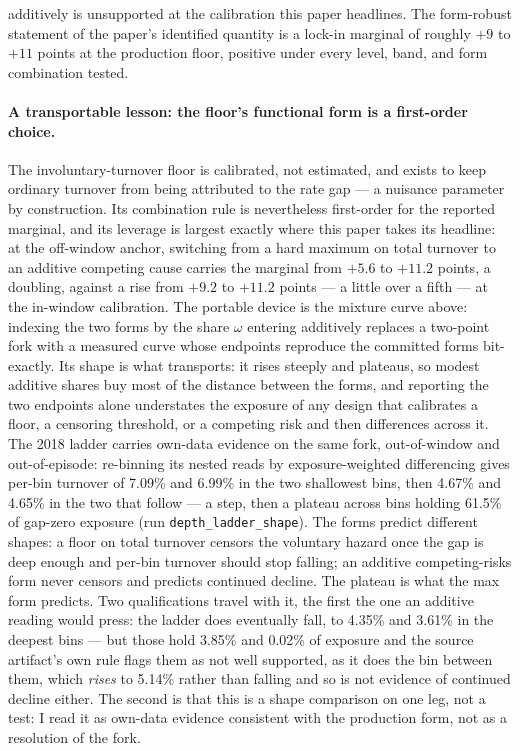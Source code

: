 \documentclass[12pt]{article}
\begin{document}
additively is unsupported at the calibration this paper headlines. The form-robust statement of the paper's identified quantity is a lock-in marginal of roughly $+9$ to $+11$ points at the production floor, positive under every level, band, and form combination tested.

\paragraph{A transportable lesson: the floor's functional form is a first-order choice.} The involuntary-turnover floor is calibrated, not estimated, and exists to keep ordinary turnover from being attributed to the rate gap --- a nuisance parameter by construction. Its combination rule is nevertheless first-order for the reported marginal, and its leverage is largest exactly where this paper takes its headline: at the off-window anchor, switching from a hard maximum on total turnover to an additive competing cause carries the marginal from $+5.6$ to $+11.2$ points, a doubling, against a rise from $+9.2$ to $+11.2$ points --- a little over a fifth --- at the in-window calibration. The portable device is the mixture curve above: indexing the two forms by the share $\omega$ entering additively replaces a two-point fork with a measured curve whose endpoints reproduce the committed forms bit-exactly. Its shape is what transports: it rises steeply and plateaus, so modest additive shares buy most of the distance between the forms, and reporting the two endpoints alone understates the exposure of any design that calibrates a floor, a censoring threshold, or a competing risk and then differences across it. The 2018 ladder carries own-data evidence on the same fork, out-of-window and out-of-episode: re-binning its nested reads by exposure-weighted differencing gives per-bin turnover of 7.09\% and 6.99\% in the two shallowest bins, then 4.67\% and 4.65\% in the two that follow --- a step, then a plateau across bins holding 61.5\% of gap-zero exposure (run \texttt{depth\_ladder\_shape}). The forms predict different shapes: a floor on total turnover censors the voluntary hazard once the gap is deep enough and per-bin turnover should stop falling; an additive competing-risks form never censors and predicts continued decline. The plateau is what the max form predicts. Two qualifications travel with it, the first the one an additive reading would press: the ladder does eventually fall, to 4.35\% and 3.61\% in the deepest bins --- but those hold 3.85\% and 0.02\% of exposure and the source artifact's own rule flags them as not well supported, as it does the bin between them, which \emph{rises} to 5.14\% rather than falling and so is not evidence of continued decline either. The second is that this is a shape comparison on one leg, not a test: I read it as own-data evidence consistent with the production form, not as a resolution of the fork.
\end{document}
